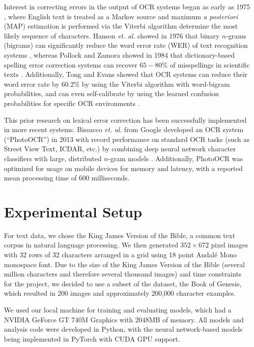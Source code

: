 \documentclass[10pt,twocolumn,letterpaper]{article}
\begin{document}
Interest in correcting errors in the output of OCR systems began as
early as 1975 \cite{Neuhoff75-TVA}, where English text is treated as
a Markov source and maximum \textit{a posteriori} (MAP) estimation
is performed via the Viterbi algorithm \cite{Forney73-TVA} determine
the most likely sequence of characters. Hanson \textit{et. al.}
showed in 1976 that binary $n$-grams (bigrams) can significantly
reduce the word error rate (WER) of text recognition systems
\cite{Hanson76-CIW}, whereas Pollock and Zamora showed in
1984 that dictionary-based spelling error correction systems
can recover $65-80\%$ of misspellings in scientific texts
\cite{Pollock84-ASC}. Additionally, Tong and Evans showed
that OCR systems can reduce their word error rate by $60.2\%$
by using the Viterbi algorithm with word-bigram probabilities, and
can even self-calibrate by using the learned confusion probabilities
for specific OCR environments \cite{Tong96-ASA}.

This prior research on lexical error correction has been successfully
implemented in more recent systems. Bissacco \textit{et. al.} from
Google developed an OCR system (``PhotoOCR'') in 2013 with record
performance on standard OCR tasks (such as Street View Text, ICDAR, etc.)
by combining deep neural network character classifiers with large,
distributed $n$-gram models \cite{Bissacco13-PRT}. Additionally, 
PhotoOCR was optimized for usage on mobile devices for memory and
latency, with a reported mean processing time of 600 milliseconds.



\section{Experimental Setup}
\label{exp_setup}

For text data, we chose the King James Version of the Bible, a
common text corpus in natural language processing. We then
generated $352 \times 672$ pixel images with 32 rows
of 32 characters arranged in a grid using 18 point Andal\'{e}
Mono monospace font. Due to the size of the King James Version of
the Bible (several million characters and therefore several thousand
images) and time constraints for the project, we decided to use a
subset of the dataset, the Book of Genesis, which resulted in 200 images
and approximately 200,000 character examples.

We used our local machine for training and evaluating models,
which had a NVIDIA GeForce GT 740M Graphics with 2048MB of memory.
All models and analysis code were developed in Python, with the
neural network-based models being implemented in PyTorch with CUDA
GPU support.
\end{document}
